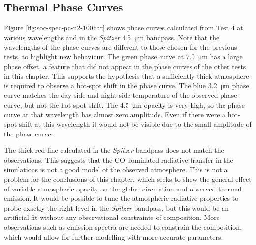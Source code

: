 
\subsection{Thermal Phase Curves}

Figure \ref{fig:soc-spec-pc-n2-100bar} shows phase curves calculated from Test 4 at various wavelengths and in the \textit{Spitzer} \SI{4.5}{\micro\metre} bandpass. Note that the wavelengths of the phase curves are different to those chosen for the previous tests, to highlight new behaviour. The green phase curve at \SI{7.0}{\micro\metre} has a large phase offset, a feature that did not appear in the phase curves of the other tests in this chapter. This supports the hypothesis that a sufficiently thick atmosphere is required to observe a hot-spot shift in the phase curve. The blue \SI{3.2}{\micro\metre} phase curve matches the day-side and night-side temperature of the observed phase curve, but not the hot-spot shift. The \SI{4.5}{\micro\metre} opacity is very high, so the phase curve at that wavelength has almost zero amplitude. Even if there were a hot-spot shift at this wavelength it would not be visible due to the small amplitude of the phase curve.

The thick red line calculated in the \textit{Spitzer} bandpass does not match the observations. This suggests that the CO-dominated radiative transfer in the simulations is not a good model of the observed atmosphere. This is not a problem for the conclusions of this chapter, which seeks to show the general effect of variable atmospheric opacity on the global circulation and observed thermal emission. It would be possible to tune the atmospheric radiative properties to probe exactly the right level in the \textit{Spitzer} bandpass, but this would be an artificial fit without any observational constraints of composition. More observations such as emission spectra are needed to constrain the composition, which would allow for further modelling with more accurate parameters.

